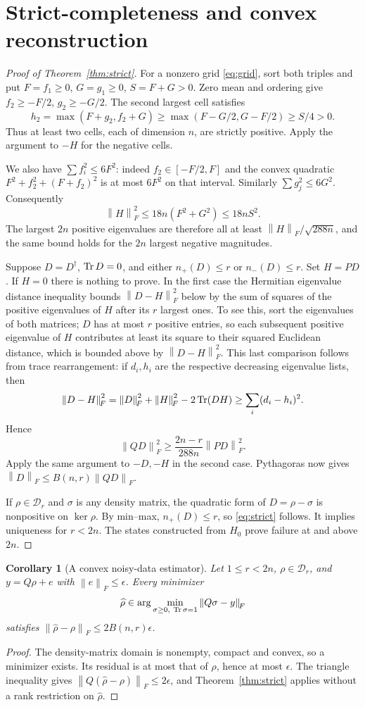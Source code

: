 \documentclass[11pt,a4paper]{article}
\newtheorem{corollary}[theorem]{Corollary}
\theoremstyle{remark}\newtheorem{remark}[theorem]{Remark}
\newcommand{\DD}{\mathcal D}\newcommand{\norm}[1]{\left\|#1\right\|_{\!F}}
\begin{document}
\section{Strict-completeness and convex reconstruction}
\begin{proof}[Proof of Theorem~\ref{thm:strict}]
For a nonzero grid \eqref{eq:grid}, sort both triples and put
$F=f_1\ge0$, $G=g_1\ge0$, $S=F+G>0$. Zero mean and ordering give
$f_2\ge-F/2$, $g_2\ge-G/2$. The second largest cell satisfies
\[
 h_2=\max(F+g_2,f_2+G)
 \ge\max(F-G/2,G-F/2)\ge S/4>0.
\]
Thus at least two cells, each of dimension $n$, are strictly positive.
Apply the argument to $-H$ for the negative cells.

We also have $\sum f_i^2\le6F^2$: indeed
$f_2\in[-F/2,F]$ and the convex quadratic
$F^2+f_2^2+(F+f_2)^2$ is at most $6F^2$ on that interval.
Similarly $\sum g_j^2\le6G^2$. Consequently
\[
 \norm H^2\le18n(F^2+G^2)\le18nS^2.
\]
The largest $2n$ positive eigenvalues are therefore all at least
$\norm H/\sqrt{288n}$, and the same bound holds for the $2n$ largest
negative magnitudes.

Suppose $D=D^\dagger$, $\operatorname{Tr} D=0$, and either $n_+(D)\le r$ or
$n_-(D)\le r$. Set $H=PD$. If $H=0$ there is nothing to prove.
In the first case the Hermitian eigenvalue distance inequality bounds
$\norm{D-H}^2$ below by the sum of squares of the positive eigenvalues
of $H$ after its $r$ largest ones. To see this, sort the eigenvalues of
both matrices; $D$ has at most $r$ positive entries, so each subsequent
positive eigenvalue of $H$ contributes at least its square to their
squared Euclidean distance, which is bounded above by
$\norm{D-H}^2$. This last comparison follows from trace rearrangement:
if $d_i,h_i$ are the respective decreasing eigenvalue lists, then
\[
 \norm{D-H}^2=\norm D^2+\norm H^2-2\Tr(DH)
 \ge\sum_i(d_i-h_i)^2.
\]
Hence
\[
 \norm{QD}^2\ge\frac{2n-r}{288n}\norm{PD}^2.
\]
Apply the same argument to $-D,-H$ in the second case. Pythagoras now
gives $\norm D\le B(n,r)\norm{QD}$.

If $\rho\in\DD_r$ and $\sigma$ is any density matrix, the quadratic form
of $D=\rho-\sigma$ is nonpositive on $\ker\rho$. By min--max,
$n_+(D)\le r$, so \eqref{eq:strict} follows. It implies uniqueness for
$r<2n$. The states constructed from $H_0$ prove failure at and above
$2n$.
\end{proof}

\begin{corollary}[A convex noisy-data estimator]\label{cor:noise}
Let $1\le r<2n$, $\rho\in\DD_r$, and $y=Q\rho+e$ with
$\norm e\le\epsilon$. Every minimizer
\[
 \widehat\rho\in\arg\min_{\sigma\ge0,\ \Tr\sigma=1}\norm{Q\sigma-y}
\]
satisfies $\norm{\widehat\rho-\rho}\le2B(n,r)\epsilon$.
\end{corollary}
\begin{proof}
The density-matrix domain is nonempty, compact and convex, so a minimizer
exists. Its residual is at most that of $\rho$, hence at most $\epsilon$.
The triangle inequality gives
$\norm{Q(\widehat\rho-\rho)}\le2\epsilon$, and
Theorem~\ref{thm:strict} applies without a rank restriction on
$\widehat\rho$.
\end{proof}
\end{document}
